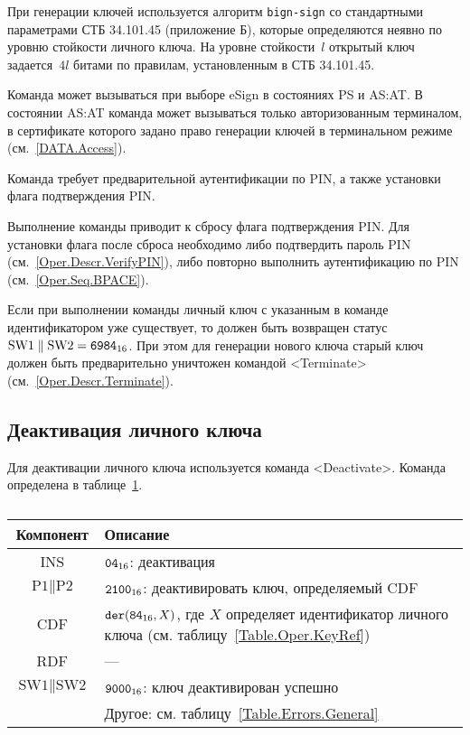 При генерации ключей используется алгоритм \texttt{bign-sign}
со стандартными параметрами СТБ 34.101.45 (приложение Б), 
которые определяются неявно по уровню стойкости личного ключа. 
%
На уровне стойкости~$l$ открытый ключ задается~$4l$ битами
по правилам, установленным в СТБ 34.101.45.

Команда может вызываться при выборе eSign в состояниях 
PS и AS:AT. В состоянии AS:AT команда может вызываться 
только авторизованным терминалом, в сертификате которого задано право
генерации ключей в терминальном режиме (см.~\ref{DATA.Access}).

Команда требует предварительной аутентификации по PIN, 
а также установки флага подтверждения PIN.

Выполнение команды приводит к сбросу флага подтверждения PIN.
Для установки флага после сброса необходимо либо подтвердить пароль PIN 
(см.~\ref{Oper.Descr.VerifyPIN}), либо повторно выполнить аутентификацию по PIN 
(см.~\ref{Oper.Seq.BPACE}). 

Если при выполнении команды личный ключ с указанным в команде идентификатором
уже существует, то должен быть возвращен статус 
$\text{SW1} \parallel \text{SW2} = \texttt{6984}_{16}$. 
При этом для генерации нового ключа старый ключ должен быть предварительно 
уничтожен командой <Terminate> (см.~\ref{Oper.Descr.Terminate}).

\subsection{Деактивация личного ключа}
\label{Oper.Descr.DeactivateKey} 

Для деактивации личного ключа используется команда <Deactivate>.
Команда определена в таблице~\ref{Table.Oper.DeactivateKeyCmd}.

\begin{table}[hbt]
\caption{}\label{Table.Oper.DeactivateKeyCmd}
\begin{tabular}{|c|p{14cm}|}
\hline
Компонент & Описание\\
\hline
\hline
INS & $\texttt{04}_{16}$: деактивация\\
\hline
$\text{P1} \parallel \text{P2}$ & $\texttt{2100}_{16}$: 
деактивировать ключ, определяемый CDF\\
\hline
CDF &  $\texttt{der}(\texttt{84}_{16}, X)$,   
где $X$ определяет идентификатор личного ключа 
(см. таблицу~\ref{Table.Oper.KeyRef})\\
\hline 
\hline
RDF & --- \\
\hline
$\text{SW1} \parallel \text{SW2}$ & 
$\texttt{9000}_{16}$: ключ деактивирован успешно \\
\cline{2-2}
  & Другое: см. таблицу~\ref{Table.Errors.General} \\
\hline
\end{tabular}
\end{table}

